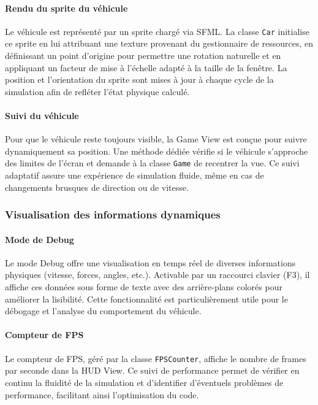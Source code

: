 \paragraph{Rendu du sprite du véhicule}
Le véhicule est représenté par un sprite chargé via SFML. La classe \texttt{Car} initialise ce sprite en lui attribuant une texture provenant du gestionnaire de ressources, en définissant un point d'origine pour permettre une rotation naturelle et en appliquant un facteur de mise à l'échelle adapté à la taille de la fenêtre.
La position et l'orientation du sprite sont mises à jour à chaque cycle de la simulation afin de refléter l'état physique calculé.

\paragraph{Suivi du véhicule}
Pour que le véhicule reste toujours visible, la Game View est conçue pour suivre dynamiquement sa position.
Une méthode dédiée vérifie si le véhicule s'approche des limites de l'écran et demande à la classe \texttt{Game} de recentrer la vue.
Ce suivi adaptatif assure une expérience de simulation fluide, même en cas de changements brusques de direction ou de vitesse.

\subsubsection{Visualisation des informations dynamiques}\label{subsubsec:visualisation-des-informations-dynamiques}

\paragraph{Mode de Debug}
Le mode Debug offre une visualisation en temps réel de diverses informations physiques (vitesse, forces, angles, etc.). Activable par un raccourci clavier (F3), il affiche ces données sous forme de texte avec des arrière-plans colorés pour améliorer la lisibilité.
Cette fonctionnalité est particulièrement utile pour le débogage et l'analyse du comportement du véhicule.

\paragraph{Compteur de FPS}
Le compteur de FPS, géré par la classe \texttt{FPSCounter}, affiche le nombre de frames par seconde dans la HUD View.
Ce suivi de performance permet de vérifier en continu la fluidité de la simulation et d'identifier d'éventuels problèmes de performance, facilitant ainsi l'optimisation du code.

